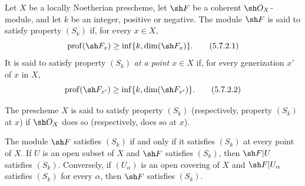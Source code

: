 \begin{definition}[5.7.2]
\label{IV.5.7.2}
Let $X$ be a locally Noetherian prescheme, let $\sh F$ be a coherent
$\sh O_X$-module, and let $k$ be an integer, positive or negative.
The module $\sh F$ is said to satisfy property $(S_k)$ if, for every
$x\in X$,
\begin{equation}
\operatorname{prof}(\sh F_x)
 \geq \inf\{k,\dim(\sh F_x)\}.
\tag{5.7.2.1}\label{IV.5.7.2.1}
\end{equation}
It is said to satisfy property $(S_k)$ \emph{at a point $x\in X$}
if, for every generization $x'$ of $x$ in $X$,
\begin{equation}
\operatorname{prof}(\sh F_{x'})
 \geq \inf\{k,\dim(\sh F_{x'})\}.
\tag{5.7.2.2}\label{IV.5.7.2.2}
\end{equation}

The prescheme $X$ is said to satisfy property $(S_k)$
(respectively, property $(S_k)$ at $x$) if $\sh O_X$ does so
(respectively, does so at $x$).

The module $\sh F$ satisfies $(S_k)$ if and only if it satisfies
$(S_k)$ at every point of $X$.  If $U$ is an open subset of $X$ and
$\sh F$ satisfies $(S_k)$, then $\sh F|U$ satisfies $(S_k)$.
Conversely, if $(U_\alpha)$ is an open covering of $X$ and
$\sh F|U_\alpha$ satisfies $(S_k)$ for every $\alpha$, then
$\sh F$ satisfies $(S_k)$.
\end{definition}

